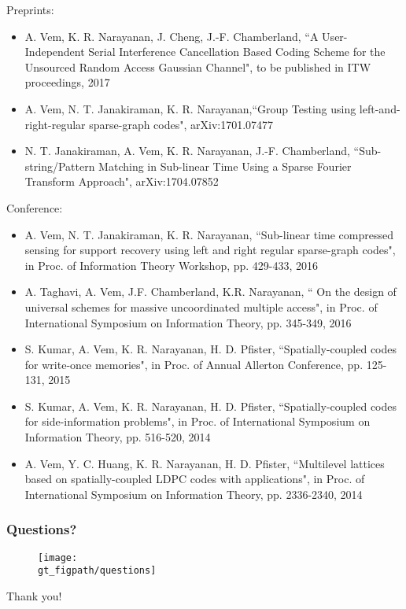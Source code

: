 \documentclass[10pt,usenames,dvipsnames]{beamer}
\def\gt_figpath{../Figures/GT}
\begin{document}
\begin{frame}%
Preprints:
{\footnotesize 
\begin{itemize}
\item A. Vem, K. R. Narayanan, J. Cheng, J.-F. Chamberland, {\blue ``A User-Independent Serial Interference Cancellation Based Coding Scheme for the Unsourced Random Access Gaussian Channel",} to be published in ITW proceedings, 2017
\item A. Vem, N. T. Janakiraman, K. R. Narayanan,{\blue ``Group Testing using left-and-right-regular sparse-graph codes",} arXiv:1701.07477
\item N. T. Janakiraman, A. Vem, K. R. Narayanan, J.-F. Chamberland, ``Sub-string/Pattern Matching in Sub-linear Time Using a Sparse Fourier Transform Approach", arXiv:1704.07852
\end{itemize}
}

Conference:
{\footnotesize 
\begin{itemize}
\item A. Vem, N. T. Janakiraman, K. R. Narayanan, {\blue ``Sub-linear time compressed sensing for support recovery using left and right regular sparse-graph codes",} in Proc. of Information Theory Workshop, pp. 429-433, 2016
\item A. Taghavi, A. Vem, J.F. Chamberland, K.R. Narayanan, `` On the design of universal schemes for massive uncoordinated multiple access", in Proc. of International Symposium on Information Theory, pp. 345-349, 2016
\item S. Kumar, A. Vem, K. R. Narayanan, H. D. Pfister, ``Spatially-coupled codes for write-once memories", in Proc. of Annual Allerton Conference, pp. 125-131, 2015
\item S. Kumar, A. Vem, K. R. Narayanan, H. D. Pfister, ``Spatially-coupled codes for side-information problems", in Proc. of International Symposium on  Information Theory, pp. 516-520, 2014
\item A. Vem, Y. C. Huang, K. R. Narayanan, H. D. Pfister,  {\blue ``Multilevel lattices based on spatially-coupled LDPC codes with applications",} in Proc. of International Symposium on Information Theory, pp. 2336-2340, 2014
\end{itemize}
}
\end{frame}
\begin{frame}\frametitle{Questions?}
	\begin{figure}[t]
		\centering
		\texttt{[image: \\gt\_figpath/questions]}
	\end{figure}
	\centering
	\color{blue}
	\Huge{Thank you!}
\end{frame}
\end{document}
